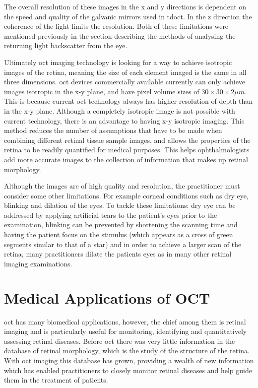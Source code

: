 The overall resolution of these images in the x and y directions is dependent on the
speed and quality of the galvanic mirrors used in \Gls{tdoct}.  In the z direction the
coherence of the light limits the resolution.  Both of these limitations were mentioned
previously in the section describing the methods of analysing the returning light
backscatter from the eye.

Ultimately \Gls{oct} imaging technology is looking for a way to achieve isotropic images
of the retina, meaning the size of each element imaged is the same in all three
dimensions.  \Gls{oct} devices commercially available currently can only achieve images
isotropic in the x-y plane, and have pixel volume sizes
of $30 \times 30 \times 2\mu m$. \cite{mbib_4}
This is because current \Gls{oct} technology always has higher resolution of depth than
in the x-y plane. \cite{mbib_4}  Although a completely isotropic image is not possible
with current technology, there is an advantage to having x-y isotropic imaging.\cite{mbib_4} This method reduces the number of assumptions that 
have to be made when combining different retinal tissue sample
images, and allows the properties of the retina to be readily quantified for medical purposes.\cite{mbib_4} This helps ophthalmologists add more accurate images to the collection of information that makes up retinal morphology.

Although the images are of high quality and resolution, the practitioner must consider
some other limitations.  For example corneal conditions such as dry eye, blinking and
dilation of the eyes.  To tackle these limitations: dry eye can be addressed by applying
artificial tears to the patient's eyes prior to the examination, blinking can be prevented
by shortening the scanning time and having the patient focus on the stimulus (which appears as a cross of green segments similar to that of a star) and in order to
achieve a larger scan of the retina, many practitioners dilate the patients eyes as
in many other retinal imaging examinations.\cite{mbib_4}

\section{Medical Applications of OCT}
\Gls{oct} has many biomedical applications, however, the chief among them is retinal imaging and is particularly useful for monitoring, identifying and quantitatively
assessing retinal diseases.\cite{mbib_9,mbib_4, mbib_5}  Before \Gls{oct} there was
very little information in the database of retinal morphology, which is the study 
of the structure of the retina.  With \Gls{oct} imaging
this database has grown, providing a wealth of new information which has enabled
practitioners to closely monitor retinal diseases and help guide them in the treatment
of patients.\cite{mbib_4}

